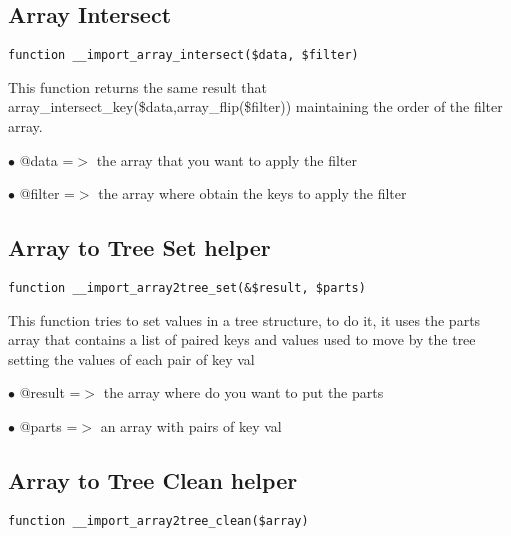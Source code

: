\documentclass[a4paper]{book}
\begin{document}
\hypertarget{toc171}{}
\subsection{Array Intersect}

\begin{lstlisting}
function __import_array_intersect($data, $filter)
\end{lstlisting}

This function returns the same result that array\_intersect\_key(\$data,array\_flip(\$filter))
maintaining the order of the filter array.

\begin{compactitem}
\item[\color{myblue}$\bullet$] @data   =$>$ the array that you want to apply the filter
\item[\color{myblue}$\bullet$] @filter =$>$ the array where obtain the keys to apply the filter
\end{compactitem}

\hypertarget{toc172}{}
\subsection{Array to Tree Set helper}

\begin{lstlisting}
function __import_array2tree_set(&$result, $parts)
\end{lstlisting}

This function tries to set values in a tree structure, to do it, it uses
the parts array that contains a list of paired keys and values used to move
by the tree setting the values of each pair of key val

\begin{compactitem}
\item[\color{myblue}$\bullet$] @result =$>$ the array where do you want to put the parts
\item[\color{myblue}$\bullet$] @parts  =$>$ an array with pairs of key val
\end{compactitem}

\hypertarget{toc173}{}
\subsection{Array to Tree Clean helper}

\begin{lstlisting}
function __import_array2tree_clean($array)
\end{lstlisting}
\end{document}
